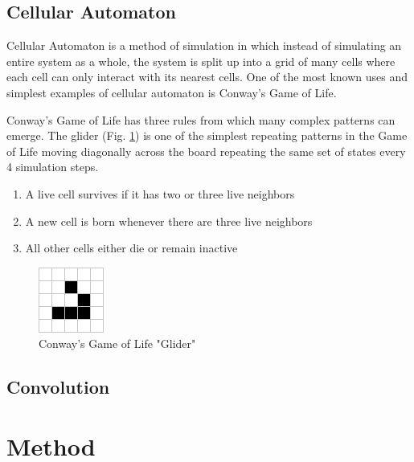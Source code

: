\documentclass[ aps, pra, reprint, notitlepage ]{revtex4-1}
\begin{document}

\subsection{\label{CellularAutomaton} Cellular Automaton}

Cellular Automaton is a method of simulation in which instead of simulating an entire system as a whole, the system is split up into a grid of many cells where each cell can only interact with its nearest cells. One of the most known uses and simplest examples of cellular automaton is Conway's Game of Life.

Conway's Game of Life has three rules from which many complex patterns can emerge.\cite{ConwayGoL} The glider (Fig. \ref{Glider}) is one of the simplest repeating patterns in the Game of Life moving diagonally across the board repeating the same set of states every 4 simulation steps.
\begin{enumerate}
	\item A live cell survives if it has two or three live neighbors
	\item A new cell is born whenever there are three live neighbors
	\item All other cells either die or remain inactive
\end{enumerate}

\begin{figure}[ht]
	\includegraphics[scale=0.75]{Pictures/Glider}
	\caption{\label{Glider}Conway's Game of Life "Glider"}
\end{figure}

\subsection{\label{Convolution} Convolution}



\section{\label{Method}Method}
\end{document}
